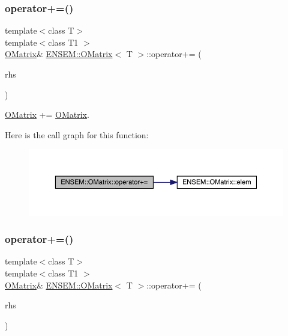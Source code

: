 \subsubsection{\texorpdfstring{operator+=()}{operator+=()}\hspace{0.1cm}{\footnotesize\ttfamily [2/6]}}
{\footnotesize\ttfamily template$<$class T$>$ \\
template$<$class T1 $>$ \\
\mbox{\hyperlink{classENSEM_1_1OMatrix}{O\+Matrix}}\& \mbox{\hyperlink{classENSEM_1_1OMatrix}{E\+N\+S\+E\+M\+::\+O\+Matrix}}$<$ T $>$\+::operator+= (\begin{DoxyParamCaption}\item[{const \mbox{\hyperlink{classENSEM_1_1OMatrix}{O\+Matrix}}$<$ T1 $>$ \&}]{rhs }\end{DoxyParamCaption})\hspace{0.3cm}{\ttfamily [inline]}}



\mbox{\hyperlink{classENSEM_1_1OMatrix}{O\+Matrix}} += \mbox{\hyperlink{classENSEM_1_1OMatrix}{O\+Matrix}}. 

Here is the call graph for this function\+:
\nopagebreak
\begin{figure}[H]
\begin{center}
\leavevmode
\includegraphics[width=350pt]{dd/d80/classENSEM_1_1OMatrix_a221eb5f9e17402ad93c829fcaf2ac60a_cgraph}
\end{center}
\end{figure}
\mbox{\label{classENSEM_1_1OMatrix_a221eb5f9e17402ad93c829fcaf2ac60a}} 
\subsubsection{\texorpdfstring{operator+=()}{operator+=()}\hspace{0.1cm}{\footnotesize\ttfamily [3/6]}}
{\footnotesize\ttfamily template$<$class T$>$ \\
template$<$class T1 $>$ \\
\mbox{\hyperlink{classENSEM_1_1OMatrix}{O\+Matrix}}\& \mbox{\hyperlink{classENSEM_1_1OMatrix}{E\+N\+S\+E\+M\+::\+O\+Matrix}}$<$ T $>$\+::operator+= (\begin{DoxyParamCaption}\item[{const \mbox{\hyperlink{classENSEM_1_1OMatrix}{O\+Matrix}}$<$ T1 $>$ \&}]{rhs }\end{DoxyParamCaption})\hspace{0.3cm}{\ttfamily [inline]}}



